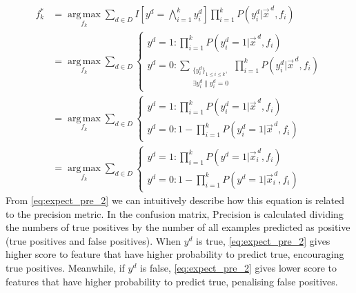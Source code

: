 \documentclass[11pt,a4paper]{article}
\begin{document}
\begin{align}
f_k^*&=\operatorname*{arg\,max}_{f_k}\sum_{d\in D}I\left[y^d=\bigwedge_{i=1}^k y^d_i\right]\prod_{i=1}^kP\left(y_i^d|\vec{x}^{\,d},f_i\right)\nonumber\\[0.5em]
&=\operatorname*{arg\,max}_{f_k}\sum_{d\in D}
\begin{cases}
	y^d=1: \prod_{i=1}^kP\left(y_i^d=1|\vec{x}^{\,d},f_i\right)\\
	y^d=0: \sum_{\substack{\{y_i^d\}_{1\leq i\leq k},\\ \exists{y_i^d\|y_i^d=0}}}\prod_{i=1}^kP\left(y_i^d|\vec{x}^{\,d},f_i\right)
\end{cases}\nonumber\\[0.5em]
&=\operatorname*{arg\,max}_{f_k}\sum_{d\in D}
\begin{cases}
	y^d=1: \prod_{i=1}^kP\left(y_i^d = 1|\vec{x}^{\,d},f_i\right)\\
	y^d=0: 1-\prod_{i=1}^kP\left(y_i^d = 1|\vec{x}^{\,d},f_i\right)
\end{cases}\label{eq:expect_pre_2}\\[0.5em]
&=\operatorname*{arg\,max}_{f_k}\sum_{d\in D}
\begin{cases}
	y^d=1: \prod_{i=1}^kP\left(y^d = 1|\vec{x}_i^{\,d},f_i\right)\\
	y^d=0: 1-\prod_{i=1}^kP\left(y^d = 1|\vec{x}_i^{\,d},f_i\right)\nonumber
\end{cases}
\end{align}
From \eqref{eq:expect_pre_2} we can intuitively describe how this equation is related to the precision metric. In the confusion matrix, Precision is calculated dividing the numbers of true positives by the number of all examples predicted as positive (true positives and false positives). When $y^d$ is true, \eqref{eq:expect_pre_2} gives higher score to feature that have higher probability to predict true, encouraging true positives. Meanwhile, if $y^d$ is false, \eqref{eq:expect_pre_2} gives lower score to features that have higher probability to predict true, penalising false positives.
\end{document}

